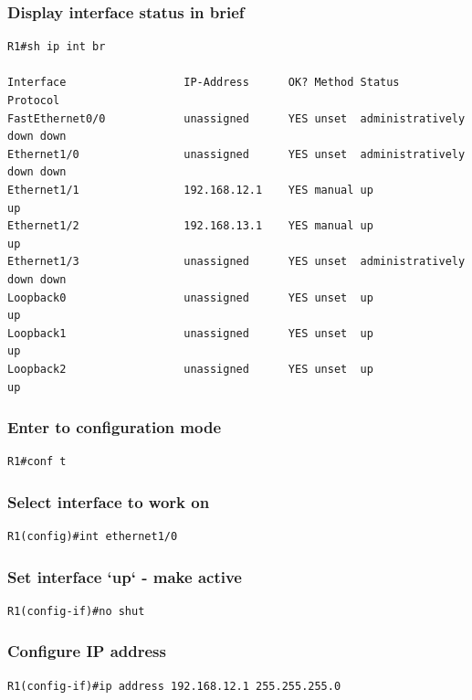 \documentclass[paper=letter, fontsize=12pt]{article}
\begin{document}
\subsubsection{Display interface status in brief}
\begin{verbatim}
R1#sh ip int br

Interface                  IP-Address      OK? Method Status                Protocol
FastEthernet0/0            unassigned      YES unset  administratively down down
Ethernet1/0                unassigned      YES unset  administratively down down
Ethernet1/1                192.168.12.1    YES manual up                    up
Ethernet1/2                192.168.13.1    YES manual up                    up
Ethernet1/3                unassigned      YES unset  administratively down down
Loopback0                  unassigned      YES unset  up                    up
Loopback1                  unassigned      YES unset  up                    up
Loopback2                  unassigned      YES unset  up                    up
\end{verbatim}

\subsubsection{Enter to configuration mode}
\begin{verbatim}
R1#conf t
\end{verbatim}

\subsubsection{Select interface to work on}
\begin{verbatim}
R1(config)#int ethernet1/0 
\end{verbatim}

\subsubsection{Set interface `up` - make active}
\begin{verbatim}
R1(config-if)#no shut
\end{verbatim}

\subsubsection{Configure IP address}
\begin{verbatim}
R1(config-if)#ip address 192.168.12.1 255.255.255.0
\end{verbatim}
\end{document}
